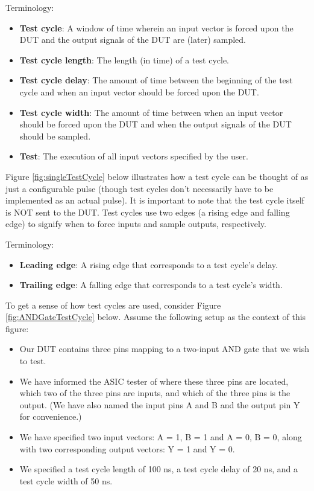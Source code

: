 \begin{flushleft} 
Terminology:  
\begin{itemize}
\item \textbf{Test cycle}: A window of time wherein an input vector is forced upon the DUT and the output signals of the DUT are (later) sampled.
\item \textbf{Test cycle length}: The length (in time) of a test cycle.
\item \textbf{Test cycle delay}: The amount of time between the beginning of the test cycle and when an input vector should be forced upon the DUT.
\item \textbf{Test cycle width}: The amount of time between when an input vector should be forced upon the DUT and when the output signals of the DUT should be sampled.
\item \textbf{Test}: The execution of all input vectors specified by the user.
\end{itemize}
\end{flushleft}

Figure \ref{fig:singleTestCycle} below illustrates how a test cycle can be thought of as just a configurable pulse (though test cycles don't necessarily have to be implemented as an actual pulse). It is important to note that the test cycle itself is NOT sent to the DUT. Test cycles use two edges (a rising edge and falling edge) to signify when to force inputs and sample outputs, respectively.

\begin{flushleft}
Terminology: 
\begin{itemize}
\item \textbf{Leading edge}: A rising edge that corresponds to a test cycle's delay.
\item \textbf{Trailing edge}: A falling edge that corresponds to a test cycle's width.
\end{itemize}
\end{flushleft}

To get a sense of how test cycles are used, consider Figure \ref{fig:ANDGateTestCycle} below. Assume the following setup as the context of this figure: 
\begin{itemize}
\item Our DUT contains three pins mapping to a two-input AND gate that we wish to test.
\item We have informed the ASIC tester of where these three pins are located, which two of the three pins are inputs, and which of the three pins is the output. (We have also named the input pins A and B and the output pin Y for convenience.)
\item We have specified two input vectors: {A = 1, B = 1} and {A = 0, B = 0}, along with two corresponding output vectors: {Y = 1} and {Y = 0}.
\item We specified a test cycle length of 100 ns, a test cycle delay of 20 ns, and a test cycle width of 50 ns.
\end{itemize}

